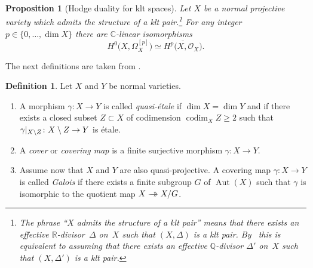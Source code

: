 \documentclass[JEP,XML,SOM,Unicode,published]{cedram}
\newenvironment{enumeratea}
{\bgroup\def\theenumi{\alph{enumi}}\begin{enumerate}}
{\end{enumerate}\egroup}
\renewcommand\theenumi{\roman{enumi}}
\newcommand{\onto}{\mathchoice{\to\hspace*{-5mm}\to}{\mathrel{\hbox{$\to\hspace*{-2.85mm}\to$}}}{\to\hspace*{-3mm}\to}{\to\hspace*{-3mm}\to}}
\theoremstyle{plain}
\newtheorem{prop}[thm]{Proposition}
\theoremstyle{definition}
\newtheorem{dfn}[thm]{Definition}
\newcommand{\Q}{\mathbb{Q}}
\newcommand{\R}{\mathbb{R}}
\newcommand{\C}{\mathbb{C}}
\newcommand{\OO}{\mathcal{O}}
\DeclareMathOperator{\codim}{codim}
\DeclareMathOperator{\Aut}{Aut}
\begin{document}
\begin{prop}[Hodge duality for klt spaces]
\label{prop:Hodge_duality}
Let $X$ be a normal projective variety which admits the structure of a klt pair.\footnote{The phrase \enquote{$X$ admits the structure of a klt pair} means that there exists an effective $\R$\nobreakdash-divisor~$\Delta$ on~$X$ such that $(X,\Delta)$ is a klt pair. By~\cite[Lem.\,2.14(i)]{TX25} this is equivalent to assuming that there exists an effective $\Q$\nobreakdash-divisor $\Delta'$ on~$X$ such that $(X,\Delta')$ is a klt pair.} For any integer $p \in \{ 0, \dots, \dim X \}$ there are $\C$-linear isomorphisms
\[
H^0 \bigl(X, \Omega_X^{[p]} \bigr) \simeq \overline{H^p \bigl(X,\OO_X \bigr)}.
\]
\end{prop}


The next definitions are taken from \cite[\S 3]{GKP16a}.

\begin{dfn}
Let $X$ and $Y$ be normal varieties.
\begin{enumeratea}
\item
A morphism $\gamma \colon X \to Y$ is called \emph{quasi-étale} if $ \dim X = \dim Y $ and if there exists a closed subset $ Z \subset X $ of codimension $\codim_X Z \geq 2$ such that $ \gamma |_{X \setminus Z} \colon X \setminus\nobreak Z \to Y $ is étale.

\item
A \emph{cover} or \emph{covering map} is a finite surjective morphism $\gamma \colon X \to Y$.

\item
Assume now that $X$ and $Y$ are also quasi-projective. A covering map \hbox{$\gamma \colon X \!\to\! Y$} is called \emph{Galois} if there exists a finite subgroup $G$ of $\Aut(X)$ such that $\gamma$ is isomorphic to the quotient map $X \onto X / G$.
\end{enumeratea}
\end{dfn}
\end{document}
